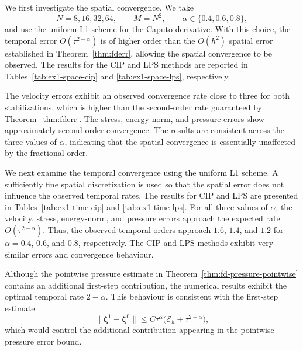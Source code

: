 \documentclass[11pt,a4paper]{article}
\numberwithin{equation}{section}
\theoremstyle{plain}
\theoremstyle{definition}
\theoremstyle{remark}
\begin{document}
We first investigate the spatial convergence. We take
\[
N=8,16,32,64, \qquad M=N^2,
\qquad \alpha\in\{0.4,0.6,0.8\},
\]
and use the uniform L1 scheme for the Caputo derivative. With this choice, the temporal error $O(\tau^{2-\alpha})$ is of higher order than the $O(h^2)$ spatial error established in Theorem~\ref{thm:fderr}, allowing the spatial convergence to be observed. The results for the CIP and LPS methods are reported in Tables~\ref{tab:ex1-space-cip} and \ref{tab:ex1-space-lps}, respectively.

The velocity errors exhibit an observed convergence rate close to three for both stabilizations, which is higher than the second-order rate guaranteed by Theorem~\ref{thm:fderr}. The stress, energy-norm, and pressure errors show approximately second-order convergence. The results are consistent across the three values of $\alpha$, indicating that the spatial convergence is essentially unaffected by the fractional order.

We next examine the temporal convergence using the uniform L1
scheme. A sufficiently fine spatial discretization is used so
that the spatial error does not influence the observed temporal
rates. The results for CIP and LPS are presented in
Tables~\ref{tab:ex1-time-cip} and \ref{tab:ex1-time-lps}.
For all three values of $\alpha$, the velocity, stress,
energy-norm, and pressure errors approach the expected rate
$O(\tau^{2-\alpha})$. Thus, the observed temporal orders
approach $1.6$, $1.4$, and $1.2$ for $\alpha=0.4$, $0.6$,
and $0.8$, respectively. The CIP and LPS methods exhibit
very similar errors and convergence behaviour.

Although the pointwise pressure estimate in
Theorem~\ref{thm:fd-pressure-pointwise} contains an additional
first-step contribution, the numerical results exhibit the
optimal temporal rate $2-\alpha$. This behaviour is consistent with the first-step estimate
\[
\|\bm\zeta^1-\bm\zeta^0\|
\le C\tau^\alpha
\bigl(\mathcal E_h+\tau^{2-\alpha}\bigr),
\]
which would control the additional contribution appearing
in the pointwise pressure error bound.
\end{document}
